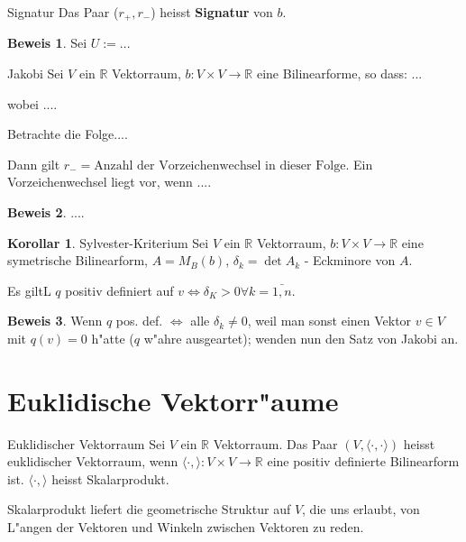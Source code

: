 \documentclass[oneside,fontsize=11pt,paper=a4,BCOR=0mm,DIV=12,automark,headsepline]{scrbook}
\theoremstyle{remark}
\theoremstyle{definition}
\newtheorem*{korollar}{Korollar}
\theoremstyle{definition}
\newtheorem*{prof}{Beweis}
\theoremstyle{remark}
\begin{document}
\begin{definition}{Signatur}{}
  Das Paar ($r_+,r_-$) heisst \textbf{Signatur} von $b$.
\end{definition}

\begin{prof}
  Sei $U:=$...
\end{prof}

\begin{satz}{Jakobi}{}
  Sei $V$ ein $\mathbb{R}$ Vektorraum, $b: V\times V \rightarrow \mathbb{R}$
  eine Bilinearforme, so dass: ...

  wobei ....

  Betrachte die Folge....

  Dann gilt $r_-=\text{Anzahl der Vorzeichenwechsel in dieser Folge}$. Ein
  Vorzeichenwechsel liegt vor, wenn  .... 
\end{satz}

\begin{prof}
  ....
\end{prof}

\begin{korollar}{Sylvester-Kriterium}
  Sei $V$ ein $\mathbb{R}$ Vektorraum, $b: V\times V \rightarrow \mathbb{R}$
  eine symetrische Bilinearform, $A=M_B(b)$, $\delta_k = \det A_k$ - Eckminore
  von $A$.

  Es giltL $q$ positiv definiert auf $v \iff \delta_K > 0 \forall k=\bar{1,n}$.
\end{korollar}

\begin{prof}
  Wenn $q$ pos. def. $\iff$ alle $\delta_k\not= 0$, weil man sonst einen Vektor
  $v\in V$ mit $q(v)=0$ h"atte ($q$ w"ahre ausgeartet); wenden nun den Satz von
  Jakobi an.
\end{prof}

\begin{exa}
  
\end{exa}


\chapter{Euklidische Vektorr"aume}
\label{sec:evr}

\begin{definition}{Euklidischer Vektorraum}{}
	Sei $V$ ein $\mathbb{R}$ Vektorraum. Das Paar $(V, \langle\cdot,\cdot\rangle)$ heisst
	euklidischer Vektorraum, wenn $\langle\cdot,\rangle: V\times V \rightarrow \mathbb{R}$
	eine positiv definierte Bilinearform ist. $\langle\cdot,\rangle$ heisst Skalarprodukt.
	
	
	Skalarprodukt liefert die geometrische Struktur auf $V$, die uns erlaubt, von
	L"angen der Vektoren und Winkeln zwischen Vektoren zu reden.  
\end{definition}
\end{document}
